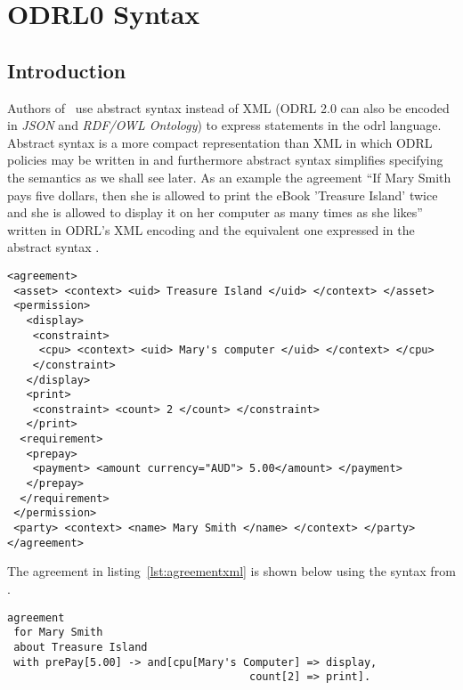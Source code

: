 \chapter{ODRL0 Syntax}
\label{chap:odrl0syntax}

\section{Introduction}

Authors of~\cite{pucella2006} use abstract syntax instead of XML (ODRL 2.0 can also be encoded in \emph{JSON} and \emph{RDF/OWL Ontology}) to express statements in the \ac{odrl} language. Abstract syntax is a more compact representation than XML in which ODRL policies may be written in and furthermore abstract syntax simplifies specifying the semantics as we shall see later. As an example the agreement ``If Mary Smith pays five dollars, then she is allowed to print the eBook 'Treasure Island' twice and she is allowed to display it on her computer as many times as she likes'' written in ODRL's XML encoding and the equivalent one expressed in the abstract syntax \cite{pucella2006}.

\lstset{language=XML}
\begin{lstlisting}[caption={agreement for Mary Smith in XML},label={lst:agreementxml}]
<agreement>
 <asset> <context> <uid> Treasure Island </uid> </context> </asset>
 <permission>
   <display>
    <constraint>
     <cpu> <context> <uid> Mary's computer </uid> </context> </cpu>
    </constraint>
   </display>
   <print>
    <constraint> <count> 2 </count> </constraint>
   </print>
  <requirement>
   <prepay>
    <payment> <amount currency="AUD"> 5.00</amount> </payment>
   </prepay>
  </requirement>
 </permission>
 <party> <context> <name> Mary Smith </name> </context> </party>
</agreement>
\end{lstlisting}

The agreement in listing~\ref{lst:agreementxml} is shown below using the syntax from \cite{pucella2006}.

\lstset{language=Pucella2006}
\begin{minipage}[c]{0.95\textwidth}
\begin{lstlisting}[frame=single, caption={agreement for Mary Smith as BNF (as used in ~\cite{pucella2006})},label={lst:agreementpucella2006}]
agreement
 for Mary Smith 
 about Treasure Island 
 with prePay[5.00] -> and[cpu[Mary's Computer] => display,
                                      count[2] => print].
\end{lstlisting}
\end{minipage} 

